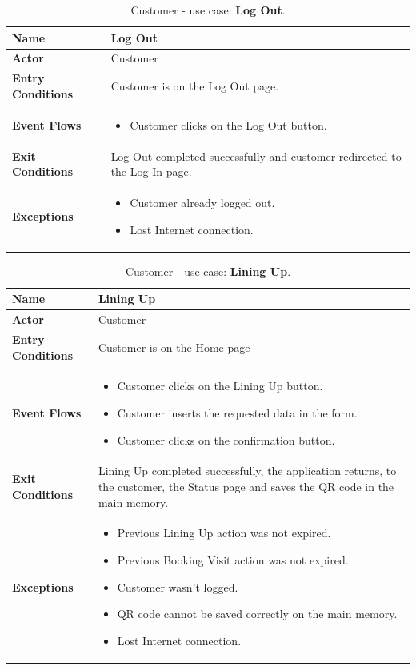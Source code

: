 \begin{table}[hbt!]
\centering
\begin{tabular}{| m{} | m{} |} 
	\hline
	\textbf{Name} & Log Out \\ 
	\hline
	\textbf{Actor} & Customer \\ 
	\hline
	\textbf{Entry Conditions} & Customer is on the Log Out page. \\ 
	\hline
	\textbf{Event Flows} &
	\begin{itemize}
	\item Customer clicks on the Log Out button.
	\end{itemize} \\ 
	\hline
	\textbf{Exit Conditions} & Log Out completed successfully and customer redirected to the Log In page. \\ 
	\hline
	\textbf{Exceptions} &
	\begin{itemize}
	\item Customer already logged out.
	\item Lost Internet connection.
	\end{itemize} \\ 
	\hline
\end{tabular}
\caption{Customer - use case: \textbf{Log Out}.}
\label{tableLogIn}
\end{table}

\begin{table}[hbt!]
\centering
\begin{tabular}{| m{} | m{} |} 
	\hline
	\textbf{Name} & Lining Up \\ 
	\hline
	\textbf{Actor} & Customer \\ 
	\hline
	\textbf{Entry Conditions} & Customer is on the Home page \\ 
	\hline
	\textbf{Event Flows} &
	\begin{itemize}
	\item Customer clicks on the Lining Up button.
	\item Customer inserts the requested data in the form.
	\item Customer clicks on the confirmation button.
	\end{itemize} \\ 
	\hline
	\textbf{Exit Conditions} & Lining Up completed successfully, the application returns, to the customer, the Status page and saves the QR code in the main memory. \\ 
	\hline
	\textbf{Exceptions} &
	\begin{itemize}
	\item Previous Lining Up action was not expired.
	\item Previous Booking Visit action was not expired.
	\item Customer wasn't logged.
	\item QR code cannot be saved correctly on the main memory.
	\item Lost Internet connection.
	\end{itemize} \\ 
	\hline
\end{tabular}
\caption{Customer - use case: \textbf{Lining Up}.}
\label{tableLogIn}
\end{table}


